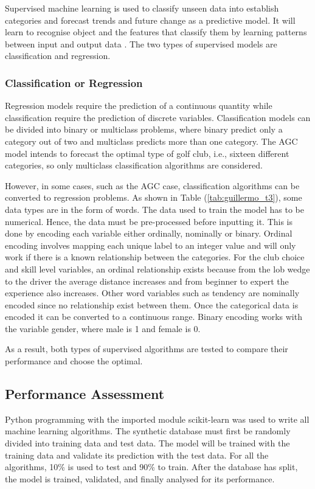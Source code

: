 \documentclass[11pt,landscape]{article}
\begin{document}
\begin{multicols}{3}
Supervised machine learning is used to classify unseen data into establish
categories and forecast trends and future change as a predictive model. It will
learn to recognise object and the features that classify them by learning
patterns between input and output data \cite{seldon}. The two
types of supervised models are classification and regression. 

\subsubsection{Classification or Regression}
Regression models require the prediction of a continuous quantity while
classification require the prediction of discrete variables. Classification
models can be divided into binary or multiclass problems, where binary predict
only a category out of two and multiclass predicts more than one category. The
AGC model intends to forecast the optimal type of golf club, i.e., sixteen
different categories, so only multiclass classification algorithms are
considered. 

However, in some cases, such as the AGC case, classification algorithms can be
converted to regression problems. As shown in Table (\ref{tab:guillermo_t3}), some data types are in
the form of words. The data used to train the model has to be numerical. Hence,
the data must be pre-processed before inputting it. This is done by encoding
each variable either ordinally, nominally or binary. Ordinal encoding involves
mapping each unique label to an integer value and will only work if there is a
known relationship between the categories. For the club choice and skill level
variables, an ordinal relationship exists because from the lob wedge to the
driver the average distance increases and from beginner to expert the experience
also increases. Other word variables such as tendency are nominally encoded
since no relationship exist between them. Once the categorical data is encoded
it can be converted to a continuous range. Binary encoding works with the
variable gender, where male is 1 and female is 0.

As a result, both types of supervised algorithms are tested to compare their
performance and choose the optimal.

\subsection{Performance Assessment}
Python programming with the imported module scikit-learn was used to write all
machine learning algorithms. The synthetic database must first be randomly
divided into training data and test data. The model will be trained with the
training data and validate its prediction with the test data. For all the
algorithms, 10\% is used to test and 90\% to train. After the database has split,
the model is trained, validated, and finally analysed for its performance.


\end{multicols}
\end{document}
